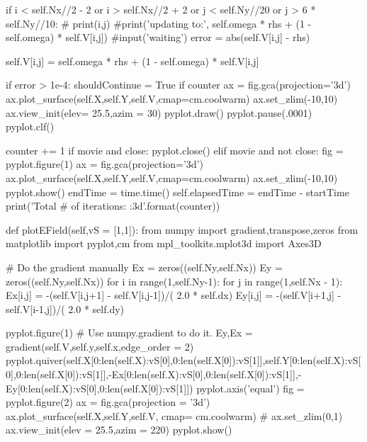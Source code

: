 \begin{enumerate}
\begin{codeexample}
\begin{VerbatimOut}{\listingFile}
                    if i < self.Nx//2 - 2  or i > self.Nx//2 + 2 or j < self.Ny//20  or  j > 6 * self.Ny//10:
                        #                        print(i,j)
                        #print('updating to:', self.omega * rhs + (1 - self.omega) * self.V[i,j])
                        #input('waiting')
                        error = abs(self.V[i,j] - rhs)
                    
                        self.V[i,j] = self.omega * rhs + (1 - self.omega) * self.V[i,j]

                        if error > 1e-4:
                            shouldContinue = True
            if counter %
                ax = fig.gca(projection='3d')
                ax.plot_surface(self.X,self.Y,self.V,cmap=cm.coolwarm)
                ax.set_zlim(-10,10)
                ax.view_init(elev= 25.5,azim = 30)
                pyplot.draw()
                pyplot.pause(.0001)
                pyplot.clf()

            counter += 1
        if movie and close:
            pyplot.close()
        elif movie and not close:
            fig = pyplot.figure(1)
            ax = fig.gca(projection='3d')
            ax.plot_surface(self.X,self.Y,self.V,cmap=cm.coolwarm)
            ax.set_zlim(-10,10)
            pyplot.show()
        endTime = time.time()
        self.elapsedTime = endTime - startTime
        print('Total # of iterations: {:3d}'.format(counter))


    def plotEField(self,vS = [1,1]):
        from numpy import gradient,transpose,zeros
        from matplotlib import pyplot,cm
        from mpl_toolkits.mplot3d import Axes3D

        # Do the gradient manually
        Ex = zeros((self.Ny,self.Nx))
        Ey = zeros((self.Ny,self.Nx))
        for i in range(1,self.Ny-1):
            for j in range(1,self.Nx - 1):
                Ex[i,j] = -(self.V[i,j+1] - self.V[i,j-1])/( 2.0 * self.dx)
                Ey[i,j] = -(self.V[i+1,j] - self.V[i-1,j])/( 2.0 * self.dy)

        pyplot.figure(1)
        # Use numpy.gradient to do it.
        Ey,Ex = gradient(self.V,self.y,self.x,edge_order = 2)
        pyplot.quiver(self.X[0:len(self.X):vS[0],0:len(self.X[0]):vS[1]],self.Y[0:len(self.X):vS[0],0:len(self.X[0]):vS[1]],-Ex[0:len(self.X):vS[0],0:len(self.X[0]):vS[1]],-Ey[0:len(self.X):vS[0],0:len(self.X[0]):vS[1]])
        pyplot.axis('equal')
        fig = pyplot.figure(2)
        ax = fig.gca(projection = '3d')
        ax.plot_surface(self.X,self.Y,self.V, cmap= cm.coolwarm)
        #        ax.set_zlim(0,1)
        ax.view_init(elev = 25.5,azim = 220)
        pyplot.show()


\end{VerbatimOut}
\end{codeexample}
\end{enumerate}
